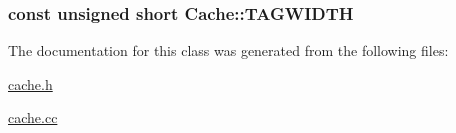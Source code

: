\hypertarget{class_cache_aac8e43dd87842bf59c9306ca5a2213e9}{
\subsubsection[{T\-A\-G\-W\-I\-D\-T\-H}]{\setlength{\rightskip}{0pt plus 5cm}const unsigned short {\bf Cache\-::\-T\-A\-G\-W\-I\-D\-T\-H}}}\label{class_cache_aac8e43dd87842bf59c9306ca5a2213e9}


The documentation for this class was generated from the following files\-:\begin{DoxyCompactItemize}
\item 
\hyperlink{cache_8h}{cache.\-h}\item 
\hyperlink{cache_8cc}{cache.\-cc}\end{DoxyCompactItemize}
